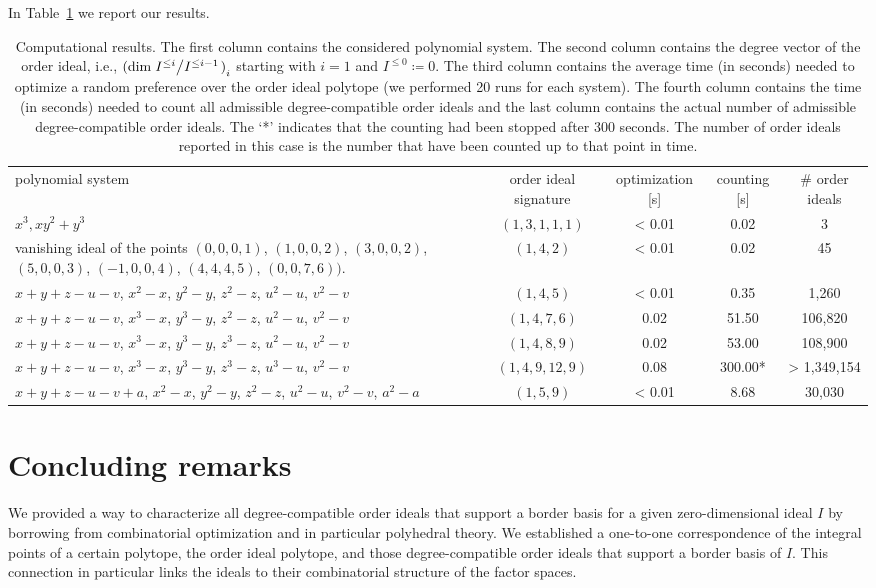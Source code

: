 \documentclass[11pt,oneside,english]{amsart}
\makeatletter
\numberwithin{equation}{section}
\numberwithin{figure}{section}
\theoremstyle{plain}
\theoremstyle{definition}
\theoremstyle{definition}
\theoremstyle{remark}
\theoremstyle{plain}
\theoremstyle{plain}
\theoremstyle{plain}
\theoremstyle{problem@}
\makeatother
\begin{document}
In Table~\ref{tab:results} we report our results.
\begin{table}[htdp]
\begin{center}
\begin{tabular}{|>{\centering}p{4cm}|c|c|c|c|}
\hline
 polynomial system & order ideal signature & optimization [s] & counting [s] & \# order ideals \\
\hhline{|=|=|=|=|=|}
$x^3, xy^2+y^3$ & $(1,3,1,1,1)$ & < 0.01 & 0.02 & 3 \\
\hline
vanishing ideal of the points \((0,0,0,1)\), \((1,0,0,2)\), \((3,0,0,2)\),
\((5,0,0,3)\), \((-1,0,0,4)\), \((4,4,4,5)\), \((0,0,7,6))\).
 & $(1,4,2) $ & < 0.01 & 0.02 & 45 \\
\hline
$x+y+z-u-v$, $x^2-x$, $y^2-y$, $z^2-z$, $u^2-u$, $v^2-v$ & $(1,4,5) $ & < 0.01 & 0.35 & 1,260 \\
\hline
$x+y+z-u-v$, $x^3-x$, $y^3-y$, $z^2-z$, $u^2-u$, $v^2-v$ & $(1,4,7,6)$ & 0.02 & 51.50 & 106,820 \\ 
\hline
$x+y+z-u-v$, $x^3-x$, $y^3-y$, $z^3-z$, $u^2-u$, $v^2-v$ & $(1,4,8,9)$ & 0.02 & 53.00 & 108,900 \\
\hline
$x+y+z-u-v$, $x^3-x$, $y^3-y$, $z^3-z$, $u^3-u$, $v^2-v$ & $(1,4,9,12,9)$ & 0.08 & 300.00* & > 1,349,154 \\
\hline
$x+y+z-u-v+a$, $x^2-x$, $y^2-y$, $z^2-z$, $u^2-u$, $v^2-v$, $a^2-a$ & $(1,5,9) $ & < 0.01 & 8.68 & 30,030 \\
\hline
\end{tabular}
\medskip
\caption{\label{tab:results}Computational results.  The first column contains
  the considered polynomial system. The second column contains the degree
  vector of the order ideal, i.e.,
  ${(\dim \left. I^{\leq i} \middle/ I^{\leq i-1} \right.)}_i$ starting
  with $i=1$ and \(I^{\leq0} \coloneqq 0\). The third column contains the average
  time (in seconds) needed to optimize a random preference over the order
  ideal polytope (we performed 20 runs for each system). The fourth column
  contains the time (in seconds) needed to count all admissible
  degree-compatible order ideals and the last column contains the actual
  number of admissible degree-compatible order ideals. The \lq{}*\rq{}
  indicates that the counting had been stopped after 300 seconds. The number
  of order ideals reported in this case is the number that have been counted
  up to that point in time.}
\end{center}
\end{table}

\section{\label{sec:Concluding-remarks}Concluding remarks}
We provided a way to characterize all degree-compatible order ideals that
support a border basis for a given zero-dimensional ideal $I$ by borrowing
from combinatorial optimization and in particular polyhedral theory. We
established a one-to-one correspondence of the integral points of a certain
polytope, the order ideal polytope, and those degree-compatible order ideals
that support a border basis of $I$. This connection in particular links the ideals to their combinatorial structure of the factor spaces. 
\end{document}
